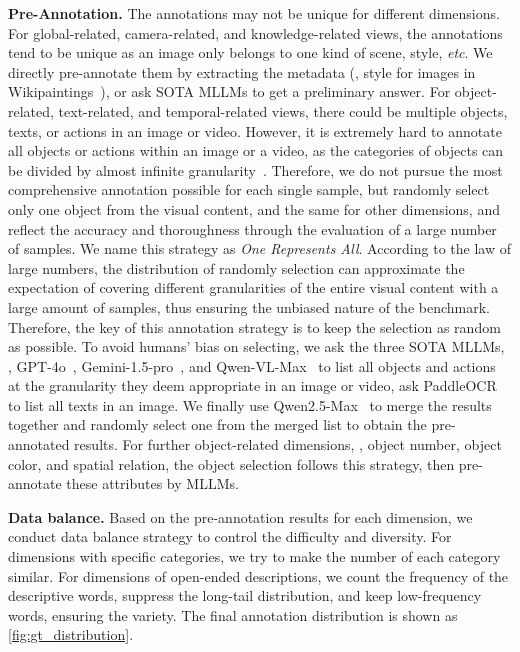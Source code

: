 \noindent\textbf{Pre-Annotation.}
The annotations may not be unique for different dimensions. For global-related, camera-related, and knowledge-related views, the annotations tend to be unique as an image only belongs to one kind of scene, style, \textit{etc}. We directly pre-annotate them by extracting the metadata (\eg, style for images in Wikipaintings~\cite{wikipaintings}), or ask SOTA MLLMs to get a preliminary answer. For object-related, text-related, and temporal-related views, there could be multiple objects, texts, or actions in an image or video.
However, it is extremely hard to annotate all objects or actions within an image or a video, as the categories of objects can be divided by almost infinite granularity~\cite{tang2023visual, wang2023all, wang2024all}. Therefore, we do not pursue the most comprehensive annotation possible for each single sample, but randomly select only one object from the visual content, and the same for other dimensions, and reflect the accuracy and thoroughness through the evaluation of a large number of samples. We name this strategy as \textit{One Represents All}. According to the law of large numbers, the distribution of randomly selection can approximate the expectation of covering different granularities of the entire visual content with a large amount of samples, thus ensuring the unbiased nature of the benchmark. Therefore, the key of this annotation strategy is to keep the selection as random as possible. To avoid humans' bias on selecting, we ask the three SOTA MLLMs, \ie, GPT-4o~\cite{gpt4o}, Gemini-1.5-pro~\cite{gemini1.5}, and Qwen-VL-Max~\cite{qwen2vl} to list all objects and actions at the granularity they deem appropriate in an image or video, ask PaddleOCR~\cite{ppocrv3} to list all texts in an image. We finally use Qwen2.5-Max~\cite{qwen2.5} to merge the results together and randomly select one from the merged list to obtain the pre-annotated results. For further object-related dimensions, \eg, object number, object color, and spatial relation, the object selection follows this strategy, then pre-annotate these attributes by MLLMs. 

\noindent\textbf{Data balance.} Based on the pre-annotation results for each dimension, we conduct data balance strategy to control the difficulty and diversity. For dimensions with specific categories, we try to make the number of each category similar. For dimensions of open-ended descriptions, we count the frequency of the descriptive words, suppress the long-tail distribution, and keep low-frequency words, ensuring the variety. The final annotation distribution is shown as \cref{fig:gt_distribution}.

